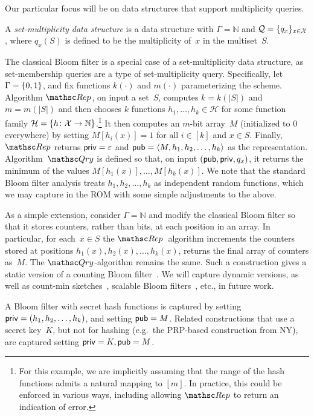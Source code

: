  Our
particular focus will be on data structures that support
multiplicity queries.

\begin{definition} \rm
A \emph{set-multiplicity data structure} is a data structure with
$\Gamma=\mathbb{N}$ and ${\cal Q}=\{q_x\}_{x \in {\cal X}}$, where
$q_x(S)$ is defined to be the multiplicity of~$x$ in the
multiset~$S$. \hfill\dqed
\end{definition}

The classical Bloom filter is a special case of a set-multiplicity
data structure, as set-membership queries are a type of
set-multiplicity query.  Specifically,
let $\Gamma=\{0,1\}$, and fix functions $k(\cdot)$ and $m(\cdot)$
parameterizing the scheme.  Algorithm $\Rep$, on input a set~$S$,
computes $k=k(|S|)$ and $m=m(|S|)$ and then chooses $k$ functions
$h_1, \ldots, h_k \in \mathcal{H}$ for some function family
$\mathcal{H}=\{h \colon {\cal X} \to \mathbb{N}\}$.\footnote{For this
  example, we are implicitly assuming that the range of the hash
  functions admits a natural mapping to $[m]$.  In practice, this
  could be enforced in various ways, including allowing $\Rep$ to
  return an indication of error. }
It then computes an $m$-bit
array~$M$ (initialized to 0 everywhere) by setting $M[h_i(x)]=1$ for
all $i\in [k]$ and $x \in S$.  Finally, $\Rep$ returns
${\sf priv}=\varepsilon$ and ${\sf pub} = \langle
M,h_1,h_2,\ldots,h_k\rangle$ as the representation.
%
Algorithm~$\Qry$ is defined so that, on input
$({\sf pub},{\sf priv},q_x)$, it returns the minimum of the values
$M[h_1(x)],\ldots,M[h_k(x)]$.  We note that the standard Bloom filter
analysis treats $h_1,h_2,\ldots,h_k$ as independent random functions,
which we may capture in the ROM with some simple adjustments to the above.

As a simple extension, consider $\Gamma=\mathbb{N}$ and modify the
classical Bloom filter so that it stores counters, rather than bits, at
each position in an array.  In particular, for each~$x \in S$ the
$\Rep$~algorithm increments the counters stored at positions
$h_1(x), h_2(x), \ldots, h_k(x)$, returns the final array of
counters as~$M$.  The $\Qry$-algorithm remains the same. Such a
construction gives a static version of a counting Bloom
filter~\cite{xxx}.  We will capture dynamic versions, as well as
count-min sketches~\cite{xxx}, scalable Bloom filters~\cite{xxx},
etc., in future work.

A Bloom filter with secret hash functions is captured by setting
${\sf priv}=(h_1,h_2,\ldots,h_k)$, and setting ${\sf pub}=M$.
Related constructions that use a secret key~$K$, but not for hashing (e.g.\ the PRP-based
construction from NY), are captured setting ${\sf priv}=K, {\sf pub}=M$.

